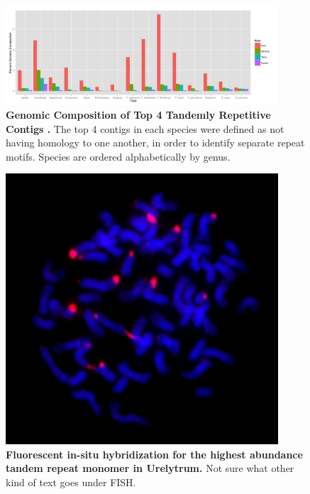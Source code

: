 \documentclass[10pt,letterpaper]{article}
\begin{document}
\begin{figure}[h]
\begin{center}
\includegraphics[width=4in]{Rankstrfcontent.png}
\end{center}
\caption{{\bf Genomic Composition of Top 4 Tandemly Repetitive Contigs .}
The top 4 contigs in each species were defined as not having homology to one another, in order to identify separate repeat motifs.
Species are ordered alphabetically by genus.
}
\label{ranktrf}
\end{figure}

\begin{figure}[h]
\begin{center}
\includegraphics[width=4in]{Udig_TK271-Repeat.png}
\end{center}
\caption{{\bf Fluorescent in-situ hybridization for the highest abundance tandem repeat monomer in Urelytrum.}
Not sure what other kind of text goes under FISH.}
\label{FISH}
\end{figure}
\end{document}
